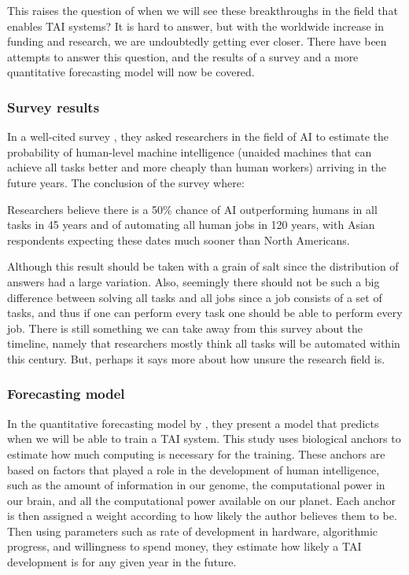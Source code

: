 \documentclass[12pt,A4]{report}
\theoremstyle{definition}
\begin{document}
This raises the question of when we will see these breakthroughs in the field that enables TAI systems? It is hard to answer, but with the worldwide increase in funding and research, we are undoubtedly getting ever closer. There have been attempts to answer this question, and the results of a survey and a more quantitative forecasting model will now be covered. 

\subsubsection{Survey results}
In a well-cited survey \citet{Grace}, they asked researchers in the field of AI to estimate the probability of human-level machine intelligence (unaided machines that can achieve all tasks better and more cheaply than human workers) arriving in the future years. The conclusion of the survey where:
\begin{displayquote}
Researchers believe there is a 50\% chance of AI outperforming humans in all tasks in 45 years and of automating all human jobs in 120 years, with Asian respondents expecting these dates much sooner than North Americans.
\end{displayquote}
Although this result should be taken with a grain of salt since the distribution of answers had a large variation. Also, seemingly there should not be such a big difference between solving all tasks and all jobs since a job consists of a set of tasks, and thus if one can perform every task one should be able to perform every job. There is still something we can take away from this survey about the timeline, namely that researchers mostly think all tasks will be automated within this century. But, perhaps it says more about how unsure the research field is. 

\subsubsection{Forecasting model}
In the quantitative forecasting model by \citet{Ajeya}, they present a model that predicts when we will be able to train a TAI system. This study uses biological anchors to estimate how much computing is necessary for the training. These anchors are based on factors that played a role in the development of human intelligence, such as the amount of information in our genome, the computational power in our brain, and all the computational power available on our planet. Each anchor is then assigned a weight according to how likely the author believes them to be. Then using parameters such as rate of development in hardware, algorithmic progress, and willingness to spend money, they estimate how likely a TAI development is for any given year in the future. 
\end{document}
